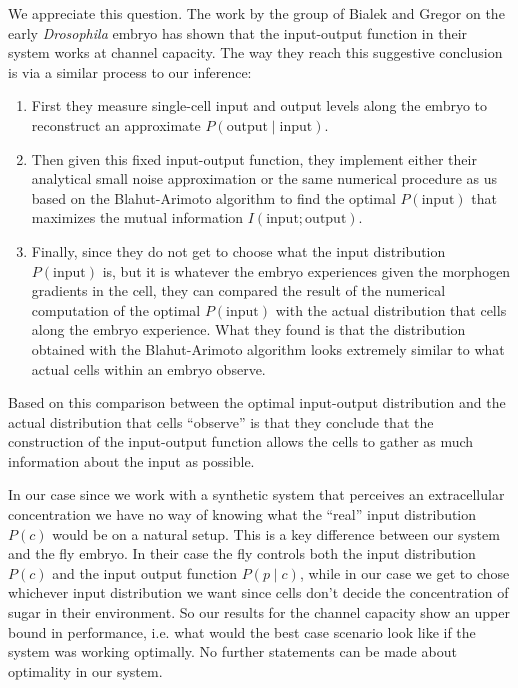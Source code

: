 We appreciate this question. The work by the group of Bialek and Gregor on the
early \textit{Drosophila} embryo has shown that the input-output function in
their system works at channel capacity. The way they reach this suggestive
conclusion is via a similar process to our inference:
\begin{enumerate}
  \item First they measure single-cell input and output levels along the embryo
  to reconstruct an approximate $P(\text{output} \mid \text{input})$.
  \item Then given this fixed input-output function, they implement either their
  analytical small noise approximation or the same numerical procedure as us
  based on the Blahut-Arimoto algorithm to find the optimal $P(\text{input})$
  that maximizes the mutual information $I(\text{input}; \text{output})$.
  \item Finally, since they do not get to choose what the input distribution
  $P(\text{input})$ is, but it is whatever the embryo experiences given the
  morphogen gradients in the cell, they can compared the result of the numerical
  computation of the optimal $P(\text{input})$ with the actual distribution that
  cells along the embryo experience. What they found is that the distribution
  obtained with the Blahut-Arimoto algorithm looks extremely similar to what
  actual cells within an embryo observe.
\end{enumerate}
Based on this comparison between the optimal input-output distribution and the
actual distribution that cells ``observe'' is that they conclude that the
construction of the input-output function allows the cells to gather as much
information about the input as possible.

In our case since we work with a synthetic system that perceives an
extracellular concentration we have no way of knowing what the ``real'' input
distribution $P(c)$ would be on a natural setup. This is a key difference
between our system and the fly embryo. In their case the fly controls both the
input distribution $P(c)$ and the input output function $P(p \mid c)$, while in
our case we get to chose whichever input distribution we want since cells don't
decide the concentration of sugar in their environment. So our results for the
channel capacity show an upper bound in performance, i.e. what would the best
case scenario look like if the system was working optimally. No further
statements can be made about optimality in our system.
